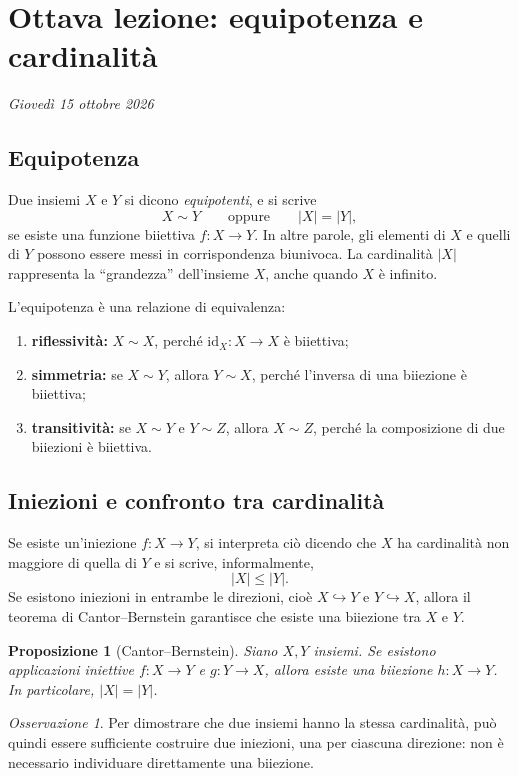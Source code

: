 \documentclass[11pt,a4paper]{article}
\newcommand{\id}{\mathrm{id}}
\theoremstyle{definition}
\theoremstyle{plain}
\newtheorem{proposizione}[definizione]{Proposizione}
\theoremstyle{remark}
\newtheorem*{osservazione}{Osservazione}
\begin{document}
\section{Ottava lezione: equipotenza e cardinalità}
\textit{Giovedì 15 ottobre 2026}

\subsection{Equipotenza}
Due insiemi $X$ e $Y$ si dicono \emph{equipotenti}, e si scrive
\[
X\sim Y\qquad\text{oppure}\qquad |X|=|Y|,
\]
se esiste una funzione biiettiva $f\colon X\to Y$. In altre parole, gli elementi di $X$ e quelli di $Y$ possono essere messi in corrispondenza biunivoca. La cardinalità $|X|$ rappresenta la ``grandezza'' dell'insieme $X$, anche quando $X$ è infinito.

L'equipotenza è una relazione di equivalenza:
\begin{enumerate}
  \item \textbf{riflessività:} $X\sim X$, perché $\id_X\colon X\to X$ è biiettiva;
  \item \textbf{simmetria:} se $X\sim Y$, allora $Y\sim X$, perché l'inversa di una biiezione è biiettiva;
  \item \textbf{transitività:} se $X\sim Y$ e $Y\sim Z$, allora $X\sim Z$, perché la composizione di due biiezioni è biiettiva.
\end{enumerate}

\subsection{Iniezioni e confronto tra cardinalità}
Se esiste un'iniezione $f\colon X\to Y$, si interpreta ciò dicendo che $X$ ha cardinalità non maggiore di quella di $Y$ e si scrive, informalmente,
\[
|X|\leq |Y|.
\]
Se esistono iniezioni in entrambe le direzioni, cioè $X\hookrightarrow Y$ e $Y\hookrightarrow X$, allora il teorema di Cantor--Bernstein garantisce che esiste una biiezione tra $X$ e $Y$.

\begin{proposizione}[Cantor--Bernstein]
Siano $X,Y$ insiemi. Se esistono applicazioni iniettive $f\colon X\to Y$ e $g\colon Y\to X$, allora esiste una biiezione $h\colon X\to Y$. In particolare, $|X|=|Y|$.
\end{proposizione}

\begin{osservazione}
Per dimostrare che due insiemi hanno la stessa cardinalità, può quindi essere sufficiente costruire due iniezioni, una per ciascuna direzione: non è necessario individuare direttamente una biiezione.
\end{osservazione}
\end{document}
